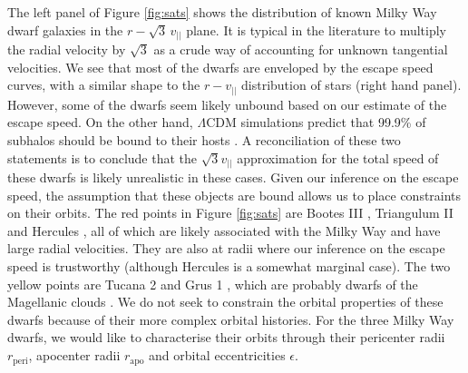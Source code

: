 \documentclass[useAMS,twocolumn,usenatbib]{mn2e}
\def\vlos{{v_{||}}}
\def\rp{{r_\mathrm{peri}}}
\def\ra{{r_\mathrm{apo}}}
\def\ecc{{\epsilon}}
\begin{document}

The left panel of Figure \ref{fig:sats} shows the distribution of known Milky Way dwarf galaxies in the $r-\sqrt{3}\,\vlos$ plane. 
It is typical in the literature to multiply the radial velocity by $\sqrt{3}$ as a crude way of accounting for unknown tangential velocities. 
We see that most of the dwarfs are enveloped by the escape speed curves, with a similar shape to the $r-\vlos$ distribution of stars (right hand panel).
However, some of the dwarfs seem likely unbound based on our estimate of the escape speed. 
On the other hand, $\Lambda$CDM simulations predict that 99.9\% of subhalos should be bound to their hosts \citep{Bo13}. 
A reconciliation of these two statements is to conclude that the $\sqrt{3}\vlos$ approximation for the total speed of these dwarfs is likely unrealistic in these cases. 
Given our inference on the escape speed, the assumption that these objects are bound allows us to place constraints on their orbits. 
The red points in Figure \ref{fig:sats} are Bootes III \citep{Gr09}, Triangulum II \citep{La15} and Hercules \citep{Be07}, all of which are likely associated with the Milky Way and have large radial velocities. 
They are also at radii where our inference on the escape speed is trustworthy (although Hercules is a somewhat marginal case).  
The two yellow points are Tucana 2 and Grus 1 \citep{Ko15,Be15}, which are probably dwarfs of the Magellanic clouds \citep{Je16}. 
We do not seek to constrain the orbital properties of these dwarfs because of their more complex orbital histories. 
For the three Milky Way dwarfs, we would like to characterise their orbits through their pericenter radii $\rp$, apocenter radii $\ra$ and orbital eccentricities $\ecc$.
\end{document}
